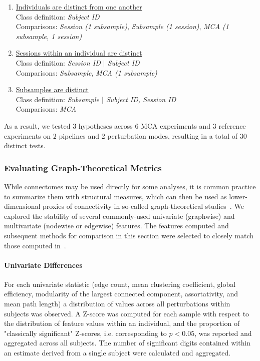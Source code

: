 \documentclass[fleqn,10pt]{SelfArx} %
\begin{document}
\begin{enumerate}[label=$H_{A\arabic*}$:]
\item \underline{Individuals are distinct from one another}\\
Class definition: \textit{Subject ID}\\
Comparisons: \textit{Session (1 subsample)}, \textit{Subsample (1 session)}, \textit{MCA (1 subsample, 1 session)}
\item \underline{Sessions within an individual are distinct}\\
Class definition: \textit{Session ID $\vert$ Subject ID}\\
Comparisons: \textit{Subsample}, \textit{MCA (1 subsample)}
\item \underline{Subsamples are distinct}\\
Class definition: \textit{Subsample $\vert$ Subject ID, Session ID}\\
Comparisons: \textit{MCA}
\end{enumerate}

As a result, we tested $3$ hypotheses across $6$ MCA experiments and $3$ reference experiments on $2$ pipelines and $2$
perturbation modes, resulting in a total of $30$ distinct tests.

\subsubsection*{Evaluating Graph-Theoretical Metrics}
While connectomes may be used directly for some analyses, it is common practice to summarize them with structural
measures, which can then be used as lower-dimensional proxies of connectivity in so-called graph-theoretical
studies~\cite{Rubinov2010-fh}. We explored the stability of several commonly-used univariate (graphwise) and
multivariate (nodewise or edgewise) features. The features computed and subsequent methods for comparison in this
section were selected to closely match those computed in~\cite{Betzel2018-eo}.

\paragraph{Univariate Differences} For each univariate statistic (edge count, mean clustering coefficient, global
efficiency, modularity of the largest connected component, assortativity, and mean path length) a distribution of
values across all perturbations within subjects was observed. A Z-score was computed for each sample with respect to
the distribution of feature values within an individual, and the proportion of "classically significant" Z-scores, i.e.
corresponding to $p < 0.05$, was reported and aggregated across all subjects. The number of significant digits
contained within an estimate derived from a single subject were calculated and aggregated.
\end{document}
